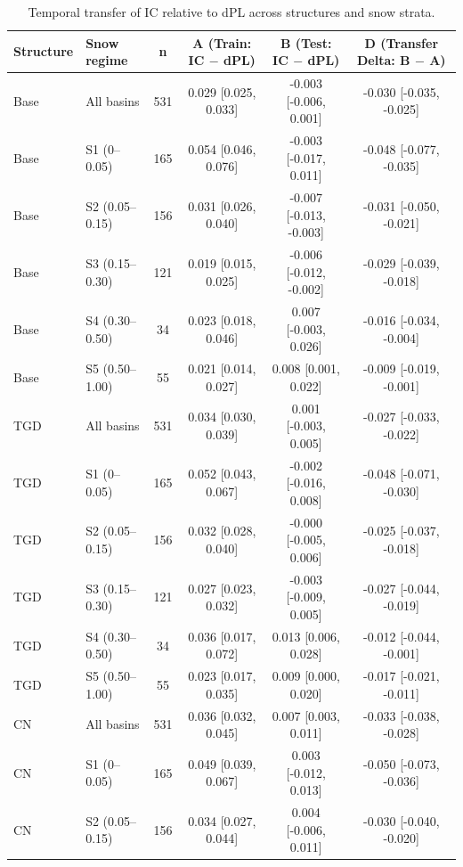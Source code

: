\begin{table}[t]
\centering
\caption{Temporal transfer of IC relative to dPL across structures and snow strata.}
\label{tab:s3_ic_dpl_temporal_transfer}
\begin{threeparttable}
\begin{tabular}{llcccc}
\toprule
Structure & Snow regime & n & A (Train: IC $-$ dPL) & B (Test: IC $-$ dPL) & D (Transfer Delta: B $-$ A) \\
\midrule
Base & All basins & 531 & 0.029 [0.025, 0.033] & -0.003 [-0.006, 0.001] & -0.030 [-0.035, -0.025] \\
Base & S1 (0–0.05) & 165 & 0.054 [0.046, 0.076] & -0.003 [-0.017, 0.011] & -0.048 [-0.077, -0.035] \\
Base & S2 (0.05–0.15) & 156 & 0.031 [0.026, 0.040] & -0.007 [-0.013, -0.003] & -0.031 [-0.050, -0.021] \\
Base & S3 (0.15–0.30) & 121 & 0.019 [0.015, 0.025] & -0.006 [-0.012, -0.002] & -0.029 [-0.039, -0.018] \\
Base & S4 (0.30–0.50) & 34 & 0.023 [0.018, 0.046] & 0.007 [-0.003, 0.026] & -0.016 [-0.034, -0.004] \\
Base & S5 (0.50–1.00) & 55 & 0.021 [0.014, 0.027] & 0.008 [0.001, 0.022] & -0.009 [-0.019, -0.001] \\
TGD & All basins & 531 & 0.034 [0.030, 0.039] & 0.001 [-0.003, 0.005] & -0.027 [-0.033, -0.022] \\
TGD & S1 (0–0.05) & 165 & 0.052 [0.043, 0.067] & -0.002 [-0.016, 0.008] & -0.048 [-0.071, -0.030] \\
TGD & S2 (0.05–0.15) & 156 & 0.032 [0.028, 0.040] & -0.000 [-0.005, 0.006] & -0.025 [-0.037, -0.018] \\
TGD & S3 (0.15–0.30) & 121 & 0.027 [0.023, 0.032] & -0.003 [-0.009, 0.005] & -0.027 [-0.044, -0.019] \\
TGD & S4 (0.30–0.50) & 34 & 0.036 [0.017, 0.072] & 0.013 [0.006, 0.028] & -0.012 [-0.044, -0.001] \\
TGD & S5 (0.50–1.00) & 55 & 0.023 [0.017, 0.035] & 0.009 [0.000, 0.020] & -0.017 [-0.021, -0.011] \\
CN & All basins & 531 & 0.036 [0.032, 0.045] & 0.007 [0.003, 0.011] & -0.033 [-0.038, -0.028] \\
CN & S1 (0–0.05) & 165 & 0.049 [0.039, 0.067] & 0.003 [-0.012, 0.013] & -0.050 [-0.073, -0.036] \\
CN & S2 (0.05–0.15) & 156 & 0.034 [0.027, 0.044] & 0.004 [-0.006, 0.011] & -0.030 [-0.040, -0.020] \\

\end{tabular}
\end{threeparttable}
\end{table}
